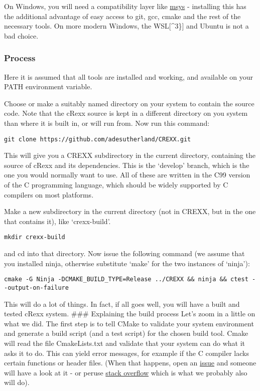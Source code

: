 On Windows, you will need a compatibility layer like
\href{https://www.msys2.org}{msys} - installing this has the additional
advantage of easy access to git, gcc, cmake and the rest of the
necessary tools. On more modern Windows, the WSL{[}\^{}3\}{]} and Ubuntu
is not a bad choice.

\hypertarget{process}{%
\subsubsection{Process}\label{process}}

Here it is assumed that all tools are installed and working, and
available on your PATH environment variable.

Choose or make a suitably named directory on your system to contain the
source code. Note that the cRexx source is kept in a different directory
on you system than where it is built in, or will run from. Now run this
command:

\begin{verbatim}
git clone https://github.com/adesutherland/CREXX.git
\end{verbatim}

This will give you a CREXX subdirectory in the current directory,
containing the source of cRexx and its dependencies. This is the
`develop' branch, which is the one you would normally want to use. All
of these are written in the C99 version of the C programming language,
which should be widely supported by C compilers on most platforms.

Make a new subdirectory in the current directory (not in CREXX, but in
the one that contains it), like `crexx-build'.

\begin{verbatim}
mkdir crexx-build
\end{verbatim}

and cd into that directory. Now issue the following command (we assume
that you installed ninja, otherwise substitute `make' for the two
instances of `ninja'):

\begin{verbatim}
cmake -G Ninja -DCMAKE_BUILD_TYPE=Release ../CREXX && ninja && ctest --output-on-failure
\end{verbatim}

This will do a lot of things. In fact, if all goes well, you will have a
built and tested cRexx system. \#\#\# Explaining the build process Let's
zoom in a little on what we did. The first step is to tell CMake to
validate your system environment and generate a build script (and a test
script) for the chosen build tool. Cmake will read the file
CmakeLists.txt and validate that your system can do what it asks it to
do. This can yield error messages, for example if the C compiler lacks
certain functions or header files. (When that happens, open an
\href{https://github.com/adesutherland/CREXX/issues}{issue} and someone
will have a look at it - or peruse
\href{https://stackoverflow.com}{stack overflow} which is what we
probably also will do).


